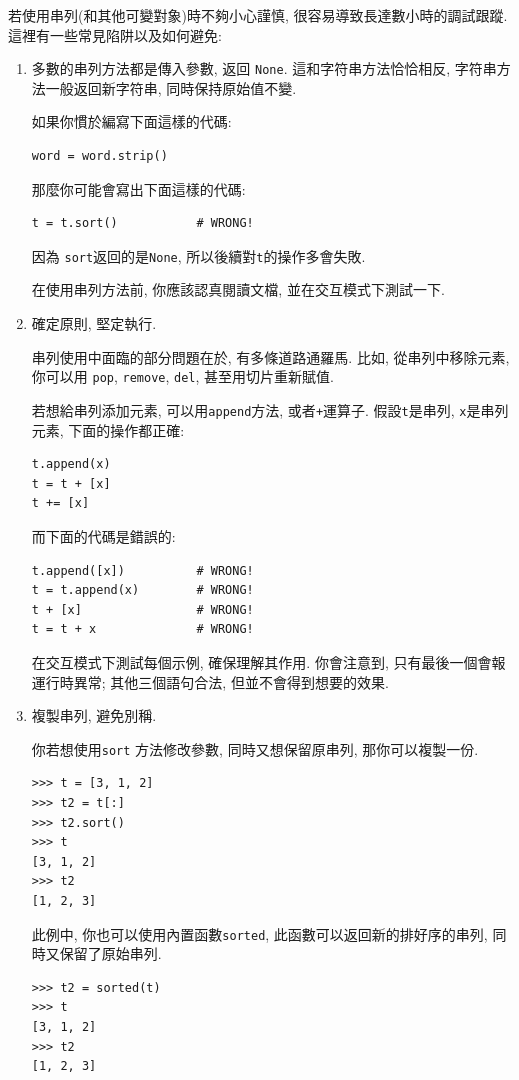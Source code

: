 \documentclass[10pt]{book}
\begin{document}
若使用串列(和其他可變對象)時不夠小心謹慎, 很容易導致長達數小時的調試跟蹤. 
這裡有一些常見陷阱以及如何避免:

\begin{enumerate}

\item 多數的串列方法都是傳入參數, 返回 {\tt None}. 
這和字符串方法恰恰相反, 字符串方法一般返回新字符串, 
同時保持原始值不變. 

如果你慣於編寫下面這樣的代碼:

\begin{verbatim}
word = word.strip()
\end{verbatim}

那麼你可能會寫出下面這樣的代碼:

\begin{verbatim}
t = t.sort()           # WRONG!
\end{verbatim}

因為 {\tt sort}返回的是{\tt None}, 所以後續對{\tt t}的操作多會失敗.

在使用串列方法前, 你應該認真閱讀文檔, 並在交互模式下測試一下. 

\item 確定原則, 堅定執行.

串列使用中面臨的部分問題在於, 有多條道路通羅馬. 
比如, 從串列中移除元素, 你可以用 {\tt pop}, {\tt remove}, {\tt del},
甚至用切片重新賦值. 

若想給串列添加元素, 可以用{\tt append}方法, 或者{\tt +}運算子. 
假設{\tt t}是串列, {\tt x}是串列元素, 下面的操作都正確: 

\begin{verbatim}
t.append(x)
t = t + [x]
t += [x]
\end{verbatim}

而下面的代碼是錯誤的:

\begin{verbatim}
t.append([x])          # WRONG!
t = t.append(x)        # WRONG!
t + [x]                # WRONG!
t = t + x              # WRONG!
\end{verbatim}

在交互模式下測試每個示例, 確保理解其作用. 
你會注意到, 只有最後一個會報運行時異常;
其他三個語句合法, 但並不會得到想要的效果. 


\item 複製串列, 避免別稱.

你若想使用{\tt sort} 方法修改參數, 同時又想保留原串列, 那你可以複製一份. 

\begin{verbatim}
>>> t = [3, 1, 2]
>>> t2 = t[:]
>>> t2.sort()
>>> t
[3, 1, 2]
>>> t2
[1, 2, 3]
\end{verbatim}

此例中, 你也可以使用內置函數{\tt sorted}, 
此函數可以返回新的排好序的串列, 同時又保留了原始串列. 

\begin{verbatim}
>>> t2 = sorted(t)
>>> t
[3, 1, 2]
>>> t2
[1, 2, 3]
\end{verbatim}

\end{enumerate}
\end{document}
